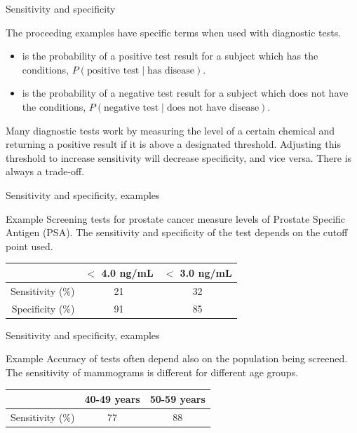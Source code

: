 \documentclass[xcolor=table, aspectratio=169, bigger, handout]{beamer}
\begin{document}
\begin{frame}{Sensitivity and specificity}
\begin{block}{}
The proceeding examples have specific terms when used with diagnostic tests.
\begin{itemize}
\pause
\item {} is the probability of a positive test result for a subject which has the conditions, $P(\text{positive test}\mid \text{has disease})$.
\pause
\item {} is the probability of a negative test result for a subject which does not have the conditions, $P(\text{negative test}\mid\text{does not have disease})$.
\end{itemize}

\pause
Many diagnostic tests work by measuring the level of a certain chemical and returning a positive result if it is above a designated threshold. Adjusting this threshold to increase sensitivity will decrease specificity, and vice versa. There is always a trade-off.
\end{block}
\end{frame}

\begin{frame}{Sensitivity and specificity, examples}
\begin{exampleblock}{Example}
Screening tests for prostate cancer measure levels of Prostate Specific Antigen (PSA). The sensitivity and specificity of the test depends on the cutoff point used.\\
\bigskip
{\centering
{}
\begin{tabular}{r | c c}
& $<$ 4.0 ng/mL & $<$ 3.0 ng/mL\\
\hline
Sensitivity (\%) & 21 & 32\\
Specificity (\%) & 91 & 85 
\end{tabular}
\par}
\end{exampleblock}
\end{frame}

\begin{frame}{Sensitivity and specificity, examples}
\begin{exampleblock}{Example}
Accuracy of tests often depend also on the population being screened. The sensitivity of mammograms is different for different age groups.\\
\bigskip
{\centering
{}
\begin{tabular}{r | c c}
& 40-49 years & 50-59 years\\
\hline
Sensitivity (\%) & 77 & 88\\
\end{tabular}
\par}
\end{exampleblock}
\end{frame}
\end{document}
